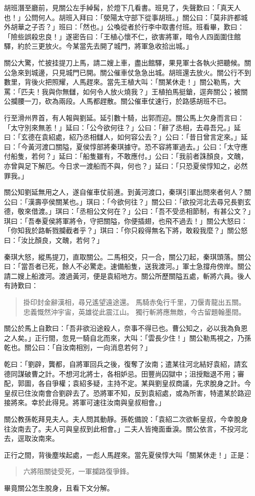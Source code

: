 胡班潛至廳前，見關公左手綽髯，於燈下几看書。班見了，失聲歎曰：「真天人也！」公問何人。胡班入拜曰：「滎陽太守部下從事胡班。」關公曰：「莫非許都城外胡華之子否？」班曰：「然也。」公喚從者於行李中取書付班。班看畢，歎曰：「險些誤殺忠良！」遂密告曰：「王植心懷不仁，欲害將軍，暗令人四面圍住館驛，約於三更放火。今某當先去開了城門，將軍急收拾出城。」

關公大驚，忙披挂提刀上馬，請二嫂上車，盡出館驛，果見軍士各執火把聽候。關公急來到城邊，只見城門已開。關公催車仗急急出城。胡班還去放火。關公行不到數里，背後火把照耀，人馬趕來。當先王植大叫：「關某休走！」關公勒馬，大罵：「匹夫！我與你無讎，如何令人放火燒我？」王植拍馬挺鎗，逕奔關公；被關公攔腰一刀，砍為兩段。人馬都趕散。關公催車仗速行，於路感胡班不已。

行至滑州界首，有人報與劉延。延引數十騎，出郭而迎。關公馬上欠身而言曰：「太守別來無恙！」延曰：「公今欲何往？」公曰：「辭了丞相，去尋吾兄。」延曰：「玄德在袁紹處，紹乃丞相讎人，如何容公去？」公曰：「昔日曾言定來。」延曰：「今黃河渡口關隘，夏侯惇部將秦琪據守。恐不容將軍過去。」公曰：「太守應付船隻，若何？」延曰：「船隻雖有，不敢應付。」公曰：「我前者誅顏良，文醜，亦曾與足下解厄。今日求一渡船而不與，何也？」延曰：「只恐夏侯惇知之，必然罪我。」

關公知劉延無用之人，遂自催車仗前進。到黃河渡口，秦琪引軍出問來者何人？關公曰：「漢壽亭侯關某也。」琪曰：「今欲何往？」關公曰：「欲投河北去尋兄長劉玄德，敬來借渡。」琪曰：「丞相公文何在？」公曰：「吾不受丞相節制，有甚公文？」琪曰：「吾奉夏侯將軍將令，守把關隘，你便插翅，也飛不過去！」關公大怒曰：「你知我於路斬戮攔截者乎？」琪曰：「你只殺得無名下將，敢殺我麼？」關公怒曰：「汝比顏良，文醜，若何？」

秦琪大怒，縱馬提刀，直取關公。二馬相交，只一合，關公刀起，秦琪頭落。關公曰：「當吾者已死，餘人不必驚走。速備船隻，送我渡河。」軍士急撐舟傍岸。關公請二嫂上船渡河。渡過黃河，便是袁紹地方。關公所歷關隘五處，斬將六員。後人有詩歎曰：

\begin{quote}
掛印封金辭漢相，尋兄遙望遠途還。
馬騎赤兔行千里，刀偃青龍出五關。
忠義慨然沖宇宙，英雄從此震江山。
獨行斬將應無敵，今古留題翰墨間。
\end{quote}

關公於馬上自歎曰：「吾非欲沿途殺人，奈事不得已也。曹公知之，必以我為負恩之人矣。」正行間，忽見一騎自北而來，大叫：「雲長少住！」關公勒馬視之，乃孫乾也。關公曰：「自汝南相別，一向消息若何？」

乾曰：「劉辟，龔都，自將軍回兵之後，復奪了汝南；遣某往河北結好袁紹，請玄德同謀破曹之計。不想河北將士，各相妒忌。田豐尚囚獄中；沮授黜退不用；審配，郭圖，各自爭權；袁紹多疑，主持不定。某與劉皇叔商議，先求脫身之計。今皇叔已住汝南會合劉辟去了。恐將軍不知，反到袁紹處，或為所害，特遣某於路迎接將來。幸於此得見。將軍可速往汝南與皇叔相會。」

關公教孫乾拜見夫人。夫人問其動靜。孫乾備說：「袁紹二次欲斬皇叔，今幸脫身往汝南去了。夫人可與皇叔到此相會。」二夫人皆掩面垂淚。關公依言，不投河北去，逕取汝南來。

正行之間，背後塵埃起處，一彪人馬趕來。當先夏侯惇大叫「關某休走！」正是：

\begin{quote}
六將阻關徒受死，一軍攔路復爭鋒。
\end{quote}

畢竟關公怎生脫身，且看下文分解。
